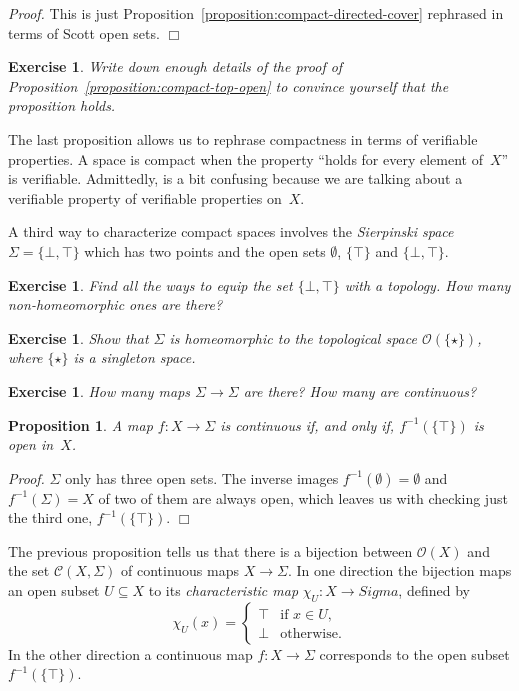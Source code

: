 \documentclass[a4paper,11pt]{article}
\newtheorem{proposition}[theorem]{Proposition}
\newtheorem{exercise}[theorem]{Exercise}
\newenvironment{proof}{\par\noindent\textit{Proof.}}{\hfill$\Box$\par\medskip}
\newcommand{\set}[1]{\{#1\}}
\newcommand{\tpl}[1]{\mathcal{O}(#1)}
\newcommand{\cont}[1]{\mathcal{C}(#1)}
\begin{document}
\begin{proof}
  This is just Proposition~\ref{proposition:compact-directed-cover}
  rephrased in terms of Scott open sets.
\end{proof}

\begin{exercise}
  Write down enough details of the proof of
  Proposition~\ref{proposition:compact-top-open} to convince yourself
  that the proposition holds.
\end{exercise}

The last proposition allows us to rephrase compactness in terms of
verifiable properties. A space is compact when the property ``holds
for every element of~$X$'' is verifiable. Admittedly, is a bit
confusing because we are talking about a verifiable property of
verifiable properties on~$X$.

A third way to characterize compact spaces involves the
\emph{Sierpinski space} $\Sigma = \set{\bot, \top}$ which has two
points and the open sets $\emptyset$, $\set{\top}$ and $\set{\bot,
  \top}$.

\begin{exercise}
  Find all the ways to equip the set $\set{\bot, \top}$ with a
  topology. How many non-homeomorphic ones are there?
\end{exercise}

\begin{exercise}
  Show that $\Sigma$ is homeomorphic to the topological space
  $\tpl{\set{\star}}$, where $\set{\star}$ is a singleton space.
\end{exercise}

\begin{exercise}
  How many maps $\Sigma \to \Sigma$ are there? How many are continuous?
\end{exercise}

\begin{proposition}
  \label{proposition:map-sigma-continuous}
  A map $f : X \to \Sigma$ is continuous if, and only if,
  $f^{-1}(\set{\top})$ is open in~$X$.
\end{proposition}

\begin{proof}
  $\Sigma$ only has three open sets. The inverse images
  $f^{-1}(\emptyset) = \emptyset$ and $f^{-1}(\Sigma) = X$ of two of
  them are always open, which leaves us with checking just the third
  one, $f^{-1}(\set{\top})$.
\end{proof}

The previous proposition tells us that there is a bijection between
$\tpl{X}$ and the set $\cont{X,\Sigma}$ of continuous maps $X \to
\Sigma$. In one direction the bijection maps an open subset $U
\subseteq X$ to its \emph{characteristic map} $\chi_U : X \to Sigma$,
defined by
%
\begin{equation*}
  \chi_U(x) =
  \begin{cases}
    \top & \text{if $x \in U$,}\\
    \bot & \text{otherwise.}
  \end{cases}  
\end{equation*}
%
In the other direction a continuous map $f : X \to \Sigma$ corresponds
to the open subset $f^{-1}(\set{\top})$.
\end{document}
